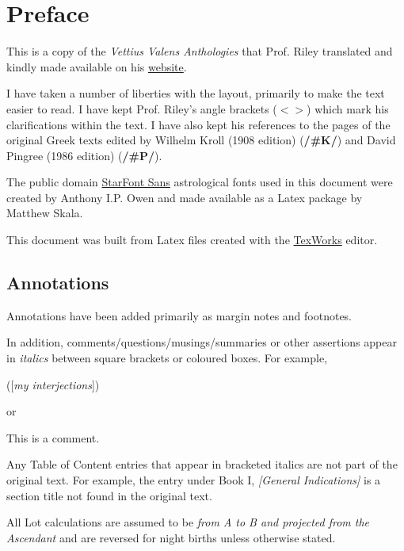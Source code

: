 \chapter{Preface}
This is a copy of the \textit{Vettius Valens Anthologies} that Prof. Riley translated and kindly made available on his \href{https://www.csus.edu/indiv/r/rileymt/}{website}.

I have taken a number of liberties with the layout, primarily to make the text easier to read. I have kept Prof. Riley's angle brackets ($< >$) which mark his clarifications within the text. I have also kept his references to the pages of the original Greek texts edited by Wilhelm Kroll (1908 edition) (\textbf{/\#K/}) and David Pingree (1986 edition) (\textbf{/\#P/}). 

The public domain \href{https://www.ctan.org/pkg/starfont}{StarFont Sans} astrological fonts used in this document were created by Anthony I.P. Owen and made available as a Latex package by Matthew Skala. 

This document was built from Latex files created with the \href{https://www.tug.org/texworks/}{TexWorks} editor.

\section{Annotations}

Annotations have been added primarily as margin notes and footnotes. 

In addition, comments/questions/musings/summaries or other assertions appear in \textit{italics} between square brackets or coloured boxes. For example, 

([\textit{my interjections}])

 or
\begin{mdframed}[backgroundcolor=cyan!5, rightmargin=1em, leftmargin=1em]
This is a comment.
\end{mdframed}

Any Table of Content entries that appear in bracketed italics are not part of the original text. For example, the entry under Book I, \textit{[General Indications]} is a section title not found in the original text.

All Lot calculations are assumed to be \textsl{from A to B and projected from the Ascendant} and are reversed for night births unless otherwise stated. 

